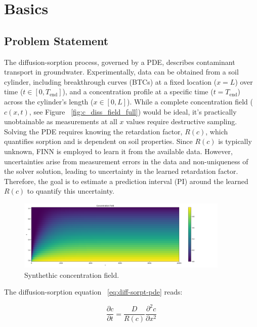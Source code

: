 \section{Basics}

\subsection{Problem Statement}
The diffusion-sorption process, governed by a PDE, describes contaminant transport in groundwater. Experimentally, data can be obtained from a soil cylinder, including breakthrough curves (BTCs) at a fixed location ($x=L$) over time ($t \in [0, T_{\text{end}}]$), and a concentration profile at a specific time ($t=T_{\text{end}}$) across the cylinder's length ($x \in [0,L]$). While a complete concentration field ($c(x,t)$, see Figure ~\vref{fig:c_diss_field_full}) would be ideal, it's practically unobtainable as measurements at all $x$ values require destructive sampling. Solving the PDE requires knowing the retardation factor, $R(c)$, which quantifies sorption and is dependent on soil properties. Since $R(c)$ is typically unknown, FINN is employed to learn it from the available data. However, uncertainties arise from measurement errors in the data and non-uniqueness of the solver solution, leading to uncertainty in the learned retardation factor. Therefore, the goal is to estimate a prediction interval (PI) around the learned $R(c)$ to quantify this uncertainty.

\begin{figure}
    \centering
    \includegraphics[width=0.9\textwidth]{figs/c_diss_field_full.png}
    \caption{Synthethic concentration field.}
    \label{fig:c_diss_field_full}
\end{figure}


The diffusion-sorption equation ~\vref{eq:diff-sorpt-pde} reads:

\begin{equation}
    \frac{\partial c}{\partial t} = \frac{D}{R(c)} \frac{\partial^2 c}{\partial x^2}
    \label{eq:diff-sorpt-pde}
\end{equation}

